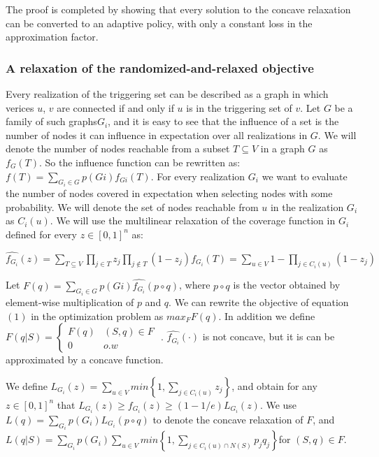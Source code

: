 The proof is completed by showing that every solution to the concave
relaxation can be converted to an adaptive policy, with only a constant
loss in the approximation factor.



\subsubsection{A relaxation of the randomized-and-relaxed objective}

Every realization of the triggering set can be described as a graph
in which verices $u$, $v$ are connected if and only if $u$ is in
the triggering set of $v$. Let $G$ be a family of such graphs$G_{i}$,
and it is easy to see that the influence of a set is the number of
nodes it can influence in expectation over all realizations in $G$.
We will denote the number of nodes reachable from a subset $T\subseteq V$
in a graph $G$ as $f_{G}(T)$. So the influence function can be rewritten
as: $f(T)=\sum_{G_{i}\in G}p(Gi)f_{Gi}(T)$. For every realization
$G_{i}$ we want to evaluate the number of nodes covered in expectation
when selecting nodes with some probability. We will denote the set
of nodes reachable from $u$ in the realization $G_{i}$ as $C_{i}(u)$.
We will use the multilinear relaxation of the coverage function in
$G_{i}$ defined for every $z\in[0,1]^{n}$ as: 

$\hat{f_{G_{i}}}(z)=\sum_{T\subseteq V}\prod_{j\in T}z_{j}\prod_{j\notin T}(1-z_{j})f_{G_{i}}(T)=\sum_{u\in V}1-\prod_{j\in C_{i}(u)}(1-z_{j})$

Let $F(q)=\sum_{G_{i}\in G}p(Gi)\hat{f_{G_{i}}}(p\circ q)$, where
$p\circ q$ is the vector obtained by element-wise multiplication
of $p$ and $q$. We can rewrite the objective of equation $(1)$
in the optimization problem as $max_{F}F(q)$. In addition we define
$F(q|S)=\begin{cases}
F(q) & (S,q)\in F\\
0 & o.w
\end{cases}$ . $\hat{f_{G_{i}}}(\cdot)$ is not concave, but it is can be approximated
by a concave function. 

We define $L_{G_{i}}(z)=\sum_{u\in V}min\left\{ 1,\sum_{j\in C_{i}(u)}z_{j}\right\} $,
and obtain for any $z\in[0,1]^{n}$ that $L_{G_{i}}(z)\geq f_{G_{i}}(z)\geq(1-1/e)L_{G_{i}}(z)$.
We use $L(q)=\sum_{G_{i}}p(G_{i})L_{G_{i}}(p\circ q)$ to denote the
concave relaxation of $F$, and $L(q|S)=\sum_{G_{i}}p(G_{i})\sum_{u\in V}min\left\{ 1,\sum_{j\in C_{i}(u)\cap N(S)}p_{j}q_{j}\right\} $for
$(S,q)\in F$. 


